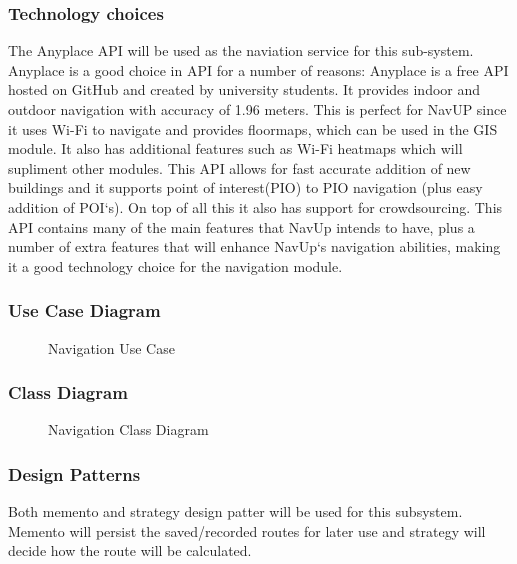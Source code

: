   
  
\subsubsection{Technology choices}
	The Anyplace API will be used as the naviation service for this sub-system. Anyplace is a good 
	choice in API for a number of reasons: Anyplace is a free API hosted on GitHub and created by 
	university students. It provides indoor and outdoor navigation with accuracy of 1.96 meters. 
	This is perfect for NavUP since it uses Wi-Fi to navigate and provides floormaps, which can be 
	used in the GIS module. It also has additional features such as Wi-Fi heatmaps which will 
	supliment other modules. This API allows for fast accurate addition of new buildings and it 
	supports point of interest(PIO) to PIO navigation (plus easy addition of POI`s). On top of all 
	this it also has support for crowdsourcing. This API contains many of the main features that NavUp
	 intends to have, plus a number of extra features that will enhance NavUp`s navigation abilities,
	  making it a good technology choice for the navigation module.
\pagebreak
\subsubsection{Use Case Diagram}
	\begin{figure}[h!]
	\caption{Navigation Use Case}
	\end{figure}
\pagebreak
\subsubsection{Class Diagram}
	\begin{figure}[h!]
	\caption{Navigation Class Diagram}
	\end{figure}

\subsubsection{Design Patterns}
	Both memento and strategy design patter will be used for this subsystem. Memento will persist the saved/recorded routes for later use and strategy will decide how the route will be calculated.

